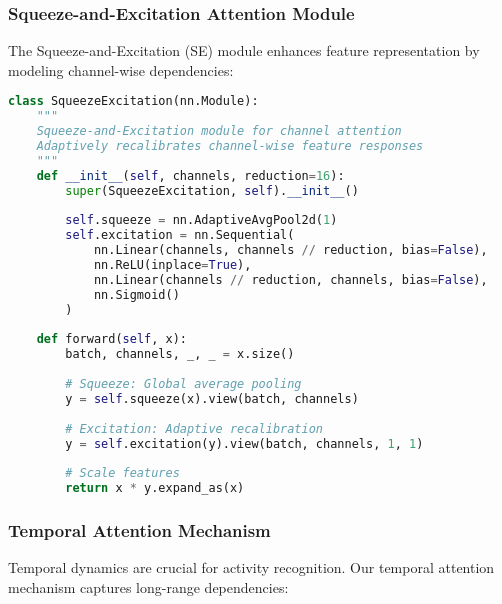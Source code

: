 \documentclass[journal]{IEEEtran}
\begin{document}
\subsubsection{Squeeze-and-Excitation Attention Module}

The Squeeze-and-Excitation (SE) module enhances feature representation by modeling channel-wise dependencies:

\begin{lstlisting}[language=Python, caption=Squeeze-and-Excitation Implementation]
class SqueezeExcitation(nn.Module):
    """
    Squeeze-and-Excitation module for channel attention
    Adaptively recalibrates channel-wise feature responses
    """
    def __init__(self, channels, reduction=16):
        super(SqueezeExcitation, self).__init__()
        
        self.squeeze = nn.AdaptiveAvgPool2d(1)
        self.excitation = nn.Sequential(
            nn.Linear(channels, channels // reduction, bias=False),
            nn.ReLU(inplace=True),
            nn.Linear(channels // reduction, channels, bias=False),
            nn.Sigmoid()
        )
        
    def forward(self, x):
        batch, channels, _, _ = x.size()
        
        # Squeeze: Global average pooling
        y = self.squeeze(x).view(batch, channels)
        
        # Excitation: Adaptive recalibration
        y = self.excitation(y).view(batch, channels, 1, 1)
        
        # Scale features
        return x * y.expand_as(x)
\end{lstlisting}

\subsubsection{Temporal Attention Mechanism}

Temporal dynamics are crucial for activity recognition. Our temporal attention mechanism captures long-range dependencies:
\end{document}
